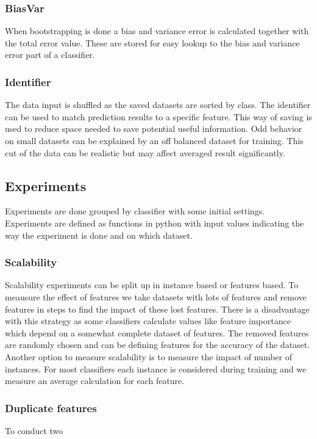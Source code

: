 \documentclass[a4paper,10pt]{article}
\begin{document}
\subsubsection{BiasVar}
When bootstrapping is done a bias and variance error is calculated together with the total error value. These are stored for easy lookup to the bias and variance error part of a classifier.

\subsubsection{Identifier}
The data input is shuffled as the saved datasets are sorted by class. The identifier can be used to match prediction results to a specific feature. This way of saving is used to reduce space needed to save potential useful information. Odd behavior on small datasets can be explained by an off balanced dataset for training. This cut of the data can be realistic but may affect averaged result significantly. 

\subsection{Experiments}
Experiments are done grouped by classifier with some initial settings. Experiments are defined as functions in python with input values indicating the way the experiment is done and on which dataset.
\subsubsection{Scalability}
Scalability experiments can be split up in instance based or features based. To meausure the effect of features we take datasets with lots of features and remove features in steps to find the impact of these lost features. There is a disadvantage with this strategy as some classifiers calculate values like feature importance which depend on a somewhat complete dataset of features. The removed features are randomly chosen and can be defining features for the accuracy of the dataset. 
Another option  to measure scalability is to measure the impact of number of instances. For most classifiers each instance is considered during training and we measure an average calculation for each feature. 

\subsubsection{Duplicate features}
To conduct two
\end{document}
